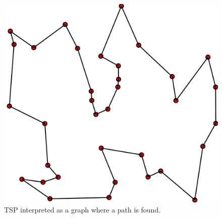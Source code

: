 \documentclass{article}
\begin{document}
\begin{figure}[ht]
 \centering
 \includegraphics[scale=.15]{docs/pictures/tsp.png}
 \caption{TSP interpreted as a graph where a path is found. \cite{wiki:TSP}}
 \label{Figure:TSP-as-graph}
\end{figure}
\end{document}
